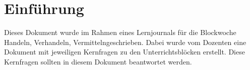 \documentclass[11pt]{article}
\begin{document}

\section{Einführung} %
Dieses Dokument wurde im Rahmen eines Lernjournals für die Blockwoche \glqq Handeln, Verhandeln, Vermitteln\grqq geschrieben.
Dabei wurde vom Dozenten eine Dokument mit jeweiligen Kernfragen zu den Unterrichtsblöcken erstellt. Diese Kernfragen sollten in diesem Dokument beantwortet werden.

\begin{comment}

  Example citation \cite{Figueredo:2009dg}.

\begin{figure}[H] %
\center{\texttt{[image: Persoenlichkeitsstruktur]}}
\caption{Example image.}
\label{fig:speciation} 
\end{figure}

\end{comment}



\begin{comment}

\newpage
\nocite{*}
 
\end{comment}

\listoffigures
\end{document}
